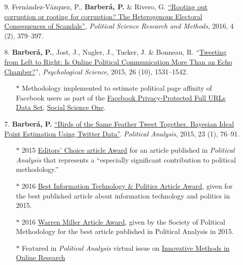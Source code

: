 \documentclass[margin,line,11pt]{resume}
\begin{document}
\begin{resume}
\begin{itemize}[leftmargin=5.5mm]
\item[9.] Fern\'{a}ndez-V\'{a}zquez, P., \textbf{Barber\'{a}, P.} \& Rivero, G. \href{http://dx.doi.org/10.1017/psrm.2015.8}{``Rooting out corruption or rooting for corruption? The Heterogenous Electoral Consequences of Scandals''}, \textit{Political Science Research and Methods}, 2016, 4 (2), 379--397.

\item[8.] \textbf{Barber\'{a}, P.}, Jost, J., Nagler, J., Tucker, J. \& Bonneau, R. ``\href{http://pss.sagepub.com/content/early/2015/08/21/0956797615594620}{Tweeting from Left to Right: Is Online Political Communication More Than an Echo Chamber?}'', \textit{Psychological Science}, 2015, 26 (10), 1531--1542.
\begin{itemize}
\item[] $\ast$ Methodology implemented to estimate political page affinity of Facebook users as part of the \href{https://socialscience.one/files/partnershipone/files/urls-v2_1.pdf}{Facebook Privacy-Protected Full URLs Data Set}, \href{https://socialscience.one/}{Social Science One}.
\end{itemize}

\item[7.] \textbf{Barber\'{a}, P.} \href{http://pan.oxfordjournals.org/cgi/reprint/mpu011?ijkey=uMFPw4dsMHM7608&keytype=ref}{``Birds of the Same Feather Tweet Together. Bayesian Ideal Point Estimation Using Twitter Data''}. \emph{Political Analysis}, 2015, 23 (1), 76--91.
\begin{itemize}
\item[] $\ast$ 2015 \href{http://oxfordjournals.org/our_journals/polana/editorschoice.html}{Editors' Choice article Award} for an article published in \textit{Political Analysis} that represents a ``especially significant contribution to political methodology.''
\vspace{-.1cm}
\item[] $\ast$ 2016 \href{http://www.apsanet.org/section-18-best-information-technology-and-politicsp-award}{Best Information Technology \& Politics Article Award}, given for the best published article about information technology and politics in 2015.
\vspace{-.1cm}
\item[] $\ast$ 2016 \href{http://www.oxfordjournals.org/our_journals/polana/awards_warrenmiller.html}{Warren Miller Article Award}, given by the Society of Political Methodology for the best article published in Political Analysis in 2015.
\vspace{-.1cm}
\item[] $\ast$ Featured in \textit{Political Analysis} virtual issue on \href{https://www.cambridge.org/core/journals/political-analysis/issue/online-research-methods/FF4E7D31B561F7FC794AF5894A53E9F3}{Innovative Methods in Online Research}
\end{itemize}



\end{itemize}
\end{resume}
\end{document}
